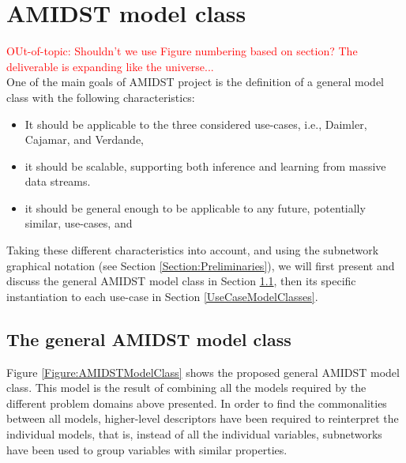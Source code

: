 \section{AMIDST model class}

\textcolor{red}{OUt-of-topic: Shouldn't we use Figure numbering based on section? The deliverable is expanding like the universe...}\\
One of the main goals of AMIDST project is the definition of a general model class with the following characteristics: 

\begin{itemize}
\item It should be applicable to the three considered use-cases, i.e., Daimler, Cajamar, and Verdande,

\item it should be scalable, supporting both inference and learning from massive data streams.

\item it should be general enough to be applicable to any future, potentially similar, use-cases, and

\end{itemize}

Taking these different characteristics into account, and using the subnetwork graphical notation (see Section \ref{Section:Preliminaries}), we will first present and discuss the general AMIDST model class in Section \ref{GeneralModelClass}, then its specific instantiation to each use-case in Section \ref{UseCaseModelClasses}.

\subsection{The general AMIDST model class}\label{GeneralModelClass}

Figure \ref{Figure:AMIDSTModelClass} shows the proposed general AMIDST model class. This model is the result of combining all the models required by the different problem domains above presented. In order to find the commonalities between all models, higher-level descriptors have been required to reinterpret the individual models, that is, instead of all the individual variables, subnetworks have been used to group variables with similar properties.



